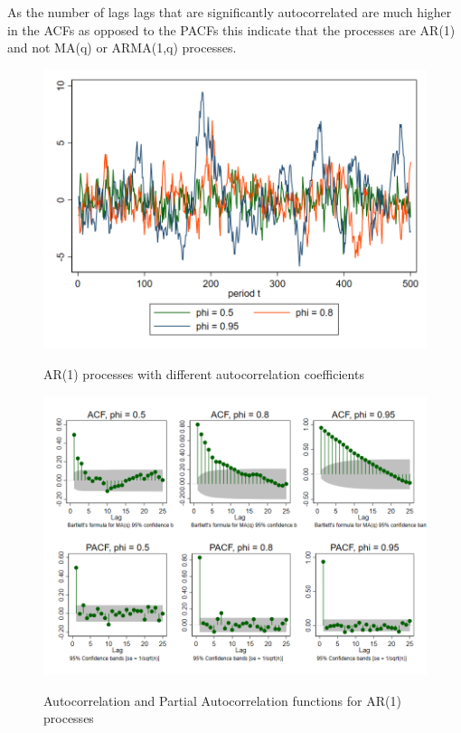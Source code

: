 As the number of lags lags that are significantly autocorrelated are much higher in the ACFs as opposed to the PACFs this indicate that the processes are AR(1) and not MA(q) or ARMA(1,q) processes.
\begin{figure}[H]
  \caption{AR(1) processes with different autocorrelation coefficients}
  \includegraphics[width= \textwidth]{03_figures/fig22b}
  \label{fig:ar1}
  \vspace{-1cm}
\end{figure}
\begin{figure}[H]
  \caption{Autocorrelation and Partial Autocorrelation functions for AR(1) processes}
  \includegraphics[width= \textwidth]{03_figures/fig22b_ac}
  \label{fig:ar1_acf}
  \vspace{-1cm}
\end{figure}
